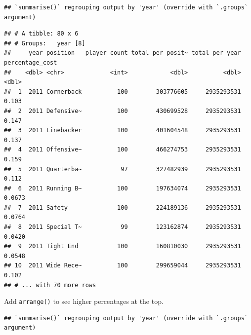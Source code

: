\documentclass[
]{book}
\newenvironment{Shaded}{\begin{snugshade}}{\end{snugshade}}
\newcommand{\DataTypeTok}[1]{\textcolor[rgb]{0.13,0.29,0.53}{#1}}
\newcommand{\KeywordTok}[1]{\textcolor[rgb]{0.13,0.29,0.53}{\textbf{#1}}}
\newcommand{\NormalTok}[1]{#1}
\newcommand{\OperatorTok}[1]{\textcolor[rgb]{0.81,0.36,0.00}{\textbf{#1}}}
\newcommand{\StringTok}[1]{\textcolor[rgb]{0.31,0.60,0.02}{#1}}
\begin{document}
\begin{verbatim}
## `summarise()` regrouping output by 'year' (override with `.groups` argument)
\end{verbatim}

\begin{verbatim}
## # A tibble: 80 x 6
## # Groups:   year [8]
##     year position   player_count total_per_posit~ total_per_year percentage_cost
##    <dbl> <chr>             <int>            <dbl>          <dbl>           <dbl>
##  1  2011 Cornerback          100        303776605     2935293531          0.103 
##  2  2011 Defensive~          100        430699528     2935293531          0.147 
##  3  2011 Linebacker          100        401604548     2935293531          0.137 
##  4  2011 Offensive~          100        466274753     2935293531          0.159 
##  5  2011 Quarterba~           97        327482939     2935293531          0.112 
##  6  2011 Running B~          100        197634074     2935293531          0.0673
##  7  2011 Safety              100        224189136     2935293531          0.0764
##  8  2011 Special T~           99        123162874     2935293531          0.0420
##  9  2011 Tight End           100        160810030     2935293531          0.0548
## 10  2011 Wide Rece~          100        299659044     2935293531          0.102 
## # ... with 70 more rows
\end{verbatim}

Add \texttt{arrange()} to see higher percentages at the top.

\begin{Shaded}
\end{Shaded}

\begin{verbatim}
## `summarise()` regrouping output by 'year' (override with `.groups` argument)
\end{verbatim}
\end{document}
